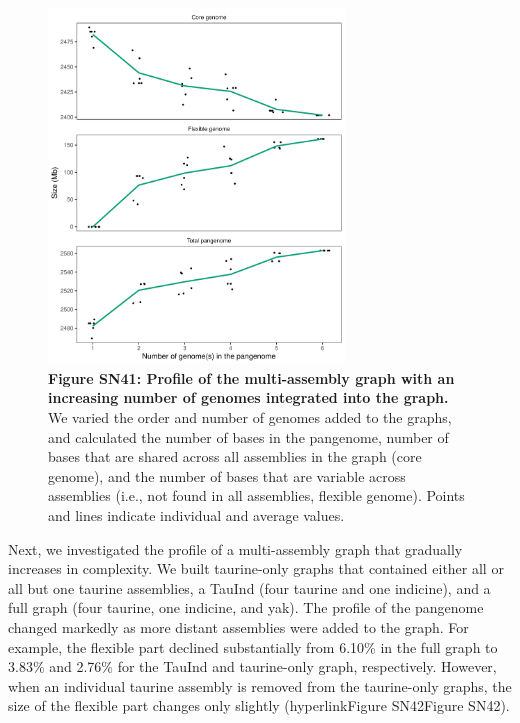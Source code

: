 \documentclass[../main.tex]{subfiles}
\begin{document}
\begin{flushleft}
\begin{figure}[!htb]
    \centering
    \includegraphics[width=0.7\textwidth]{paper3/supplement/sp415.pdf}
    \caption*{\textbf{\hypertarget{Figure SN41}{Figure SN41}: Profile of the multi-assembly graph with an increasing number of genomes integrated into the graph.} \\
    \footnotesize{We varied the order and number of genomes added to the graphs, and calculated the number of bases in the pangenome, number of bases that are shared across all assemblies in the graph (core genome), and the number of bases that are variable across assemblies (i.e., not found in all assemblies, flexible genome). Points and lines indicate individual and average values.}}
\end{figure}

\bigskip
Next, we investigated the profile of a multi-assembly graph that gradually increases in complexity. We built taurine-only graphs that contained either all or all but one taurine assemblies, a TauInd (four taurine and one indicine), and a full graph (four taurine, one indicine, and yak). The profile of the pangenome changed markedly as more distant assemblies were added to the graph. For example, the flexible part declined substantially from 6.10\% in the full graph to 3.83\% and 2.76\% for the TauInd and taurine-only graph, respectively. However, when an individual taurine assembly is removed from the taurine-only graphs, the size of the flexible part changes only slightly (hyperlink{Figure SN42}{Figure SN42}).


\end{flushleft}
\end{document}
